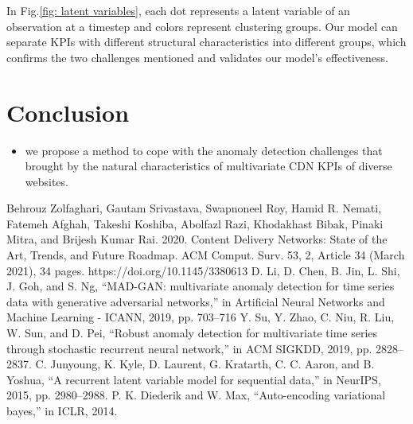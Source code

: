 \documentclass[a0,portrait]{a0poster}
\begin{document}
\begin{multicols}{2}
In Fig.\ref{fig: latent variables}, each dot represents a latent variable of an observation at a timestep and colors represent clustering groups. Our model can separate KPIs with different structural characteristics into different groups, which confirms the two challenges mentioned and validates our model's effectiveness.


\section*{Conclusion}

\begin{itemize}
\item we propose a method to cope with the anomaly detection challenges that brought by the natural characteristics of multivariate CDN KPIs of diverse websites.
\end{itemize}


\begin{thebibliography}{00}
	
	\label{cite:b1}
		Behrouz Zolfaghari, Gautam Srivastava, Swapnoneel Roy, Hamid R. Nemati, Fatemeh Afghah, Takeshi Koshiba, Abolfazl Razi, Khodakhast Bibak, Pinaki Mitra, and Brijesh Kumar Rai. 2020. Content Delivery Networks: State of the Art, Trends, and Future Roadmap. ACM Comput. Surv. 53, 2, Article 34 (March 2021), 34 pages. https://doi.org/10.1145/3380613	
	\label{cite:b2}
		D. Li, D. Chen, B. Jin, L. Shi, J. Goh, and S. Ng, “MAD-GAN:
		multivariate anomaly detection for time series data with generative adversarial networks,” in Artificial Neural Networks and Machine Learning
		- ICANN, 2019, pp. 703–716
	\label{cite:b3}	
		Y. Su, Y. Zhao, C. Niu, R. Liu, W. Sun, and D. Pei, “Robust anomaly
		detection for multivariate time series through stochastic recurrent neural
		network,” in ACM SIGKDD, 2019, pp. 2828–2837.	
	\label{cite:b4}
		C. Junyoung, K. Kyle, D. Laurent, G. Kratarth, C. C. Aaron, and
		B. Yoshua, “A recurrent latent variable model for sequential data,” in
		NeurIPS, 2015, pp. 2980–2988.
	\label{cite:b5}
		P. K. Diederik and W. Max, “Auto-encoding variational bayes,” in ICLR,
		2014.
		
\end{thebibliography}


\end{multicols}
\end{document}
